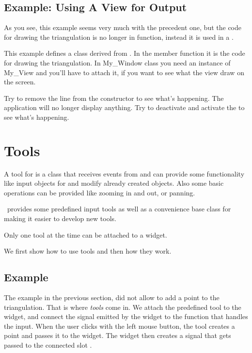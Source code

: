 \subsection{Example: Using A View for Output}

As you see, this example seems very much with the precedent one, but
the code for drawing the triangulation is no longer in 
 function, instead it is used in a .

This example defines a class derived from . In the member
function  it is the code for drawing the triangulation. In 
My\_Window class you need an instance of My\_View and you'll have to attach it,
if you want to see what the view draw on the screen.

Try to remove the line  from the constructor to see
what's happening. The application will no longer display anything. Try to
deactivate and activate the  to see what's happening.


\section{Tools}
\label{Qt_widget_tools}

A tool for  is a class that receives events from
 and can provide some functionality like input
objects for  and modify already created
objects. Also some basic operations can be provided like zooming in
and out, or panning.

\cgal\ provides some predefined input tools as well as a convenience base class 
 for making it easier to develop new tools.

Only one tool at the time can be attached to a widget.

We first show how to use tools and then how they work.

\subsection{Example}

The example in the previous section, did not allow to add a point to the triangulation.
That is where {\em  tools} come in. We attach the predefined tool 
to the widget, and connect the signal emitted by the widget to the function that 
handles the input.  When the user clicks with the left mouse button, the tool creates
a point and passes it to the widget. The widget then creates a signal that gets passed
to the connected slot .

